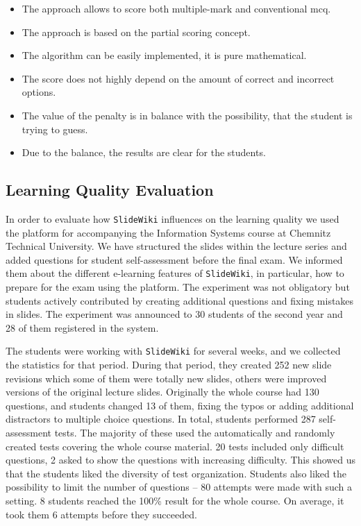 \documentclass[PhD, Submit, ngerman,UKenglish,table]{scrbook}
\begin{document}
\begin{itemize}
  \item The approach allows to score both multiple-mark and conventional \gls{mcq}.
  \item The approach is based on the partial scoring concept.
  \item The algorithm can be easily implemented, it is pure mathematical.
  \item The score does not highly depend on the amount of correct and incorrect options.
  \item The value of the penalty is in balance with the possibility, that the student is trying to guess.
  \item Due to the balance, the results are clear for the students.  
\end{itemize}

\subsection{Learning Quality Evaluation}

\label{sec:learning_qual}
In order to evaluate how \texttt{SlideWiki} influences on the learning quality we used the platform for accompanying the Information Systems course at Chemnitz Technical University.
We have structured the slides within the lecture series and added questions for student self-assessment before the final exam.
We informed them about the different e-learning features of \texttt{SlideWiki}, in particular, how to prepare for the exam using the platform.
The experiment was not obligatory but students actively contributed by creating additional questions and fixing mistakes in slides.
The experiment was announced to 30 students of the second year and 28 of them registered in the system.

The students were working with \texttt{SlideWiki} for several weeks, and we collected the statistics for that period.
During that period, they created 252 new slide revisions which some of them were totally new slides, others were improved versions of the original lecture slides.
Originally the whole course had 130 questions, and students changed 13 of them, fixing the typos or adding additional distractors to multiple choice questions.
In total, students performed 287 self-assessment tests.
The majority of these used the automatically and randomly created tests covering the whole course material.
20 tests included only difficult questions, 2 asked to show the questions with increasing difficulty.
This showed us that the students liked the diversity of test organization.
Students also liked the possibility to limit the number of questions -- 80 attempts were made with such a setting.
8 students reached the 100\% result for the whole course.
On average, it took them 6 attempts before they succeeded.
\end{document}

